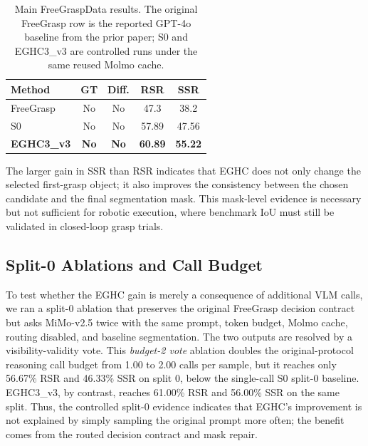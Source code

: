 \begin{table}[t]
\centering
\caption{Main FreeGraspData results. The original FreeGrasp row is the reported GPT-4o baseline from the prior paper; S0 and EGHC3\_v3 are controlled runs under the same reused Molmo cache.}
\label{tab:main}
\small
\begin{tabular}{@{}lcccc@{}}
\toprule
Method & GT & Diff. & RSR & SSR \\
\midrule
FreeGrasp~\cite{freegrasp} & No & No & 47.3 & 38.2 \\
S0 & No & No & 57.89 & 47.56 \\
\textbf{EGHC3\_v3} & \textbf{No} & \textbf{No} & \textbf{60.89} & \textbf{55.22} \\
\bottomrule
\end{tabular}
\end{table}

The larger gain in SSR than RSR indicates that EGHC does not only change the selected first-grasp object; it also improves the consistency between the chosen candidate and the final segmentation mask. This mask-level evidence is necessary but not sufficient for robotic execution, where benchmark IoU must still be validated in closed-loop grasp trials.

\subsection{Split-0 Ablations and Call Budget}

To test whether the EGHC gain is merely a consequence of additional VLM calls, we ran a split-0 ablation that preserves the original FreeGrasp decision contract but asks MiMo-v2.5 twice with the same prompt, token budget, Molmo cache, routing disabled, and baseline segmentation. The two outputs are resolved by a visibility-validity vote. This \emph{budget-2 vote} ablation doubles the original-protocol reasoning call budget from 1.00 to 2.00 calls per sample, but it reaches only 56.67\% RSR and 46.33\% SSR on split 0, below the single-call S0 split-0 baseline. EGHC3\_v3, by contrast, reaches 61.00\% RSR and 56.00\% SSR on the same split. Thus, the controlled split-0 evidence indicates that EGHC's improvement is not explained by simply sampling the original prompt more often; the benefit comes from the routed decision contract and mask repair.

